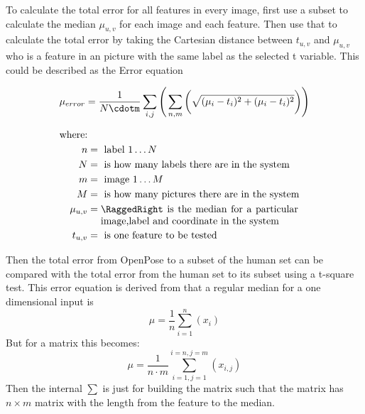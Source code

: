 \par

To calculate the total error for all features in every image, first use a subset to calculate the median \(\mu_{u,v}\) for each image and each feature.
Then use that to calculate the total error by taking the Cartesian distance between \(t_{u,v}\) and \(\mu_{u,v}\) who is a feature in an picture with the same label as the selected t variable.
This could be described as the Error equation

\begin{equation} %
\label{eq:impl:muerror}
\mu_{error}=\frac{1}{N\cdotm}\sum_{i,j}\Bigg(\sum_{n,m}\bigg(\sqrt{(\mu_i-t_i)^2+(\mu_i-t_i)^2}\bigg)\Bigg)
\end{equation}

\begin{align*}
    \text{where:}\\
    n &= \text{ label } 1\dots N\\
    N &= \text{ is how many labels there are in the system}\\
    m &= \text{ image } 1\dots M\\
    M &= \text{ is how many pictures there are in the system}\\
    \mu_{u,v} &= \parbox[t]{7cm}{\RaggedRight is the median for a particular image,label and coordinate in the system}\\
    t_{u,v} &= \text{ is one feature to be tested}
\end{align*}
\par
Then the total error from OpenPose to a subset of the human set can be compared with the total error from the human set to its subset using a t-square test.
This error equation is derived from that a regular median for a one dimensional input is
\[
\mu = \frac{1}{n}\sum_{i=1}^n (x_i)
\]
But for a matrix this becomes:
\[
\mu = \frac{1}{n\cdot m} \sum_{i=1,j=1}^{i=n,j=m}(x_{i,j})
\]
Then the internal \(\sum\) is just for building the matrix such that the matrix has \(n\times m\) matrix with the length from the feature to the median.






